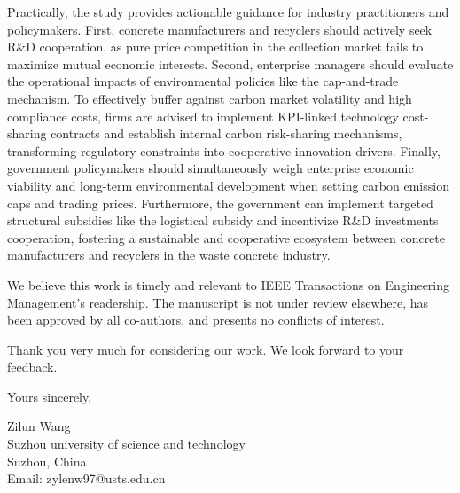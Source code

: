 \documentclass[12pt]{article}
\begin{document}
Practically, the study provides actionable guidance for industry practitioners and policymakers. First, concrete manufacturers and recyclers should actively seek R\&D cooperation, as pure price competition in the collection market fails to maximize mutual economic interests. Second, enterprise managers should evaluate the operational impacts of environmental policies like the cap-and-trade mechanism. To effectively buffer against carbon market volatility and high compliance costs, firms are advised to implement KPI-linked technology cost-sharing contracts and establish internal carbon risk-sharing mechanisms, transforming regulatory constraints into cooperative innovation drivers. Finally, government policymakers should simultaneously weigh enterprise economic viability and long-term environmental development when setting carbon emission caps and trading prices. Furthermore, the government can implement targeted structural subsidies like the logistical subsidy and incentivize R\&D investments cooperation, fostering a sustainable and cooperative ecosystem between concrete manufacturers and recyclers in the waste concrete industry.

We believe this work is timely and relevant to IEEE Transactions on Engineering Management's readership. The manuscript is not under review elsewhere, has been approved by all co-authors, and presents no conflicts of interest.

Thank you very much for considering our work. We look forward to your feedback.

Yours sincerely,

Zilun Wang\\
Suzhou university of science and technology\\
Suzhou, China\\
Email: zylenw97@usts.edu.cn
\end{document}
